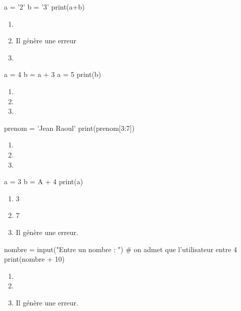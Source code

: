 \documentclass[a4paper,10pt]{article}
\begin{document}
\begin{multicols}{2}
\begin{pythoncode}
a = '2'
b = '3'
print(a+b)
\end{pythoncode}
\begin{enumerate}[\case\ \ a.]
\item    {}
\item    Il génère une erreur
\item    {}
\end{enumerate}

\newpage
\begin{pythoncode}
a = 4
b = a + 3
a = 5
print(b)
\end{pythoncode}
\begin{enumerate}[\case\ \ a.]
\item    {}
\item {}
\item {}
\end{enumerate}

\begin{pythoncode}
prenom = 'Jean Raoul'
print(prenom[3:7])
\end{pythoncode}
\begin{enumerate}[\case\ \ a.]
\item    {}
\item    {}
\item    {}
\end{enumerate}
\columnbreak
\begin{pythoncode}
a = 3
b = A + 4
print(a)
\end{pythoncode}

\begin{enumerate}[\case\ \ a.]
\item    3
\item    7
\item    Il génère une erreur.
\end{enumerate}

\begin{pythoncode}
nombre = input("Entre un nombre : ")
# on admet que l'utilisateur entre 4
print(nombre + 10)
\end{pythoncode}

\begin{enumerate}[\case\ \ a.]
\item    {}
\item    {}
\item   Il génère une erreur.
\end{enumerate}

\end{multicols}
\end{document}
